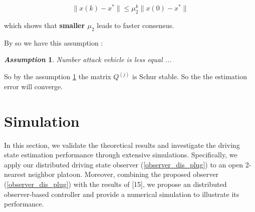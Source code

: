 \documentclass[letterpaper, 10pt, conference]{ieeeconf}  %
\def\eqref#1{(\ref{#1})}
\newtheorem{remark}{\it Remark}%
\newtheorem{assumption}{\it Assumption}%
\begin{document}
\begin{equation}
    \| x(k) - x^* \| \leq \mu_2^k \| x(0) - x^* \|
\end{equation}

which shows that \textbf{smaller $\mu_2$} leads to faster consensus.

By so we have this assumption : 
\begin{assumption}\label{number_attack}
Number attack vehicle is less equal ...
\end{assumption}
So by the assumption \ref{number_attack} the matrix $Q^{(j)}$ is Schur stable. So the the estimation error will converge.








\section{Simulation}



In this section, we validate the theoretical results and investigate the driving state estimation performance through extensive
simulations. Specifically, we apply our distributed driving state
observer \eqref{observer_dis_plug} to an open 2-nearest neighbor platoon. Moreover,
combining the proposed observer \eqref{observer_dis_plug} with the results of [15], we
propose an distributed observer-based controller and provide a
numerical simulation to illustrate its performance.
\end{document}
